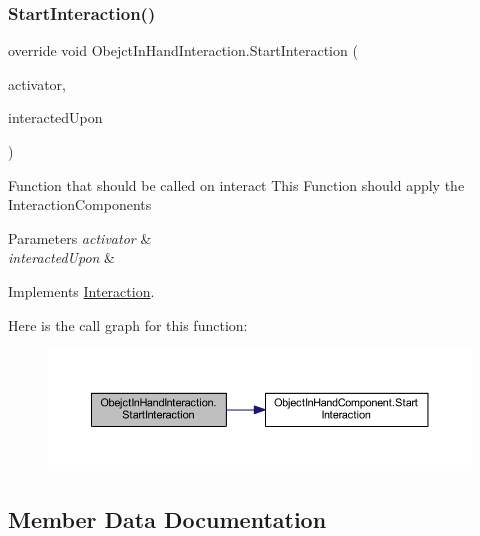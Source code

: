 \mbox{\label{class_obejct_in_hand_interaction_a9046df053628946f7ce5f4e484097482}} 
\subsubsection{\texorpdfstring{Start\+Interaction()}{StartInteraction()}}
{\footnotesize\ttfamily override void Obejct\+In\+Hand\+Interaction.\+Start\+Interaction (\begin{DoxyParamCaption}\item[{Game\+Object}]{activator,  }\item[{Game\+Object}]{interacted\+Upon }\end{DoxyParamCaption})\hspace{0.3cm}{\ttfamily [virtual]}}



Function that should be called on interact This Function should apply the Interaction\+Components 


\begin{DoxyParams}{Parameters}
{\em activator} & \\
\hline
{\em interacted\+Upon} & \\
\hline
\end{DoxyParams}


Implements \mbox{\hyperlink{class_interaction_afa5031e1db8f7c23cf26c896937e69f9}{Interaction}}.

Here is the call graph for this function\+:
\nopagebreak
\begin{figure}[H]
\begin{center}
\leavevmode
\includegraphics[width=350pt]{class_obejct_in_hand_interaction_a9046df053628946f7ce5f4e484097482_cgraph}
\end{center}
\end{figure}


\subsection{Member Data Documentation}
\mbox{\label{class_obejct_in_hand_interaction_a3efd026997c61e49e9ffd3f26e1c80dd}} 
